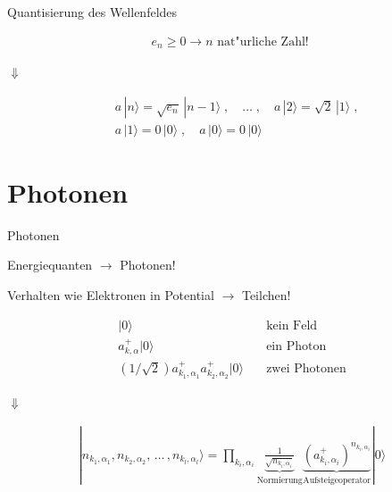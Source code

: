 \documentclass{beamer}
\begin{document}
\begin{frame}[t]{Quantisierung des Wellenfeldes}
	\vspace*{-0.5cm}
	\begin{center}
		\begin{minipage}{0.35\textwidth}
			\begin{align*}
			e_n \geq 0 \rightarrow n \text{ nat"urliche Zahl! }
			\end{align*}
		\end{minipage}
		
		\vspace*{0.5cm}
		$\Downarrow$
		
		\begin{minipage}{0.35\textwidth}
			\begin{align*}
			& a\,|n\rangle = \sqrt{e_n}\,|n-1\rangle  \;, \quad \hdots \; , \quad a\,|2\rangle = \sqrt{2}\,|1\rangle \; , \\
			 & a\,|1\rangle = 0\,|0\rangle \;, \quad a\,|0\rangle = 0\,|0\rangle
			\end{align*}
		\end{minipage}
	\end{center}
\end{frame}


\section{Photonen}
\begin{frame}[t]{Photonen}
	\vspace*{-0.5cm}
	\begin{center}
		Energiequanten $\rightarrow$ Photonen!
		
		Verhalten wie Elektronen in Potential $\rightarrow$ Teilchen!
		
		\begin{minipage}{0.35\textwidth}
			\begin{align*}
			|0\rangle & \quad \text{kein Feld}\\
			a^+_{k,\alpha}|0\rangle & \quad \text{ein Photon}\\
			\left(1/\sqrt{2}\right)a^+_{k_1,\alpha_1}a^+_{k_2,\alpha_2}|0\rangle & \quad \text{zwei Photonen}
			\end{align*}
		\end{minipage}
		
		\vspace*{0.5cm}
		$\Downarrow$
		
		\begin{minipage}{0.35\textwidth}
			\begin{align*}
			|n_{k_1,\alpha_1}, n_{k_2,\alpha_2}, \, \hdots \, , n_{k_l,\alpha_l}\rangle =
			\prod_{k_i,\alpha_i}\underbrace{\frac{1}{\sqrt{n_{k_i,\alpha_i}}}}_{\text{Normierung}} \underbrace{\left(a^+_{k_i,\alpha_i}\right)^{n_{k_i,\alpha_i}}}_{\text{Aufsteigeoperator}} |0\rangle
			\end{align*}
		\end{minipage}
	\end{center}
\end{frame}
\end{document}
